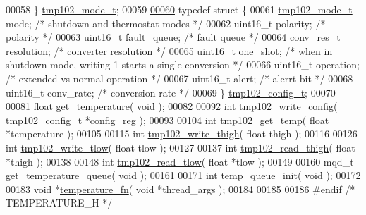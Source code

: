\begin{DoxyCode}
00058 \} \hyperlink{structtmp102__mode__t}{tmp102\_mode\_t};
00059 
\hyperlink{structtmp102__config__t}{00060} \textcolor{keyword}{typedef} \textcolor{keyword}{struct }\{
00061    \hyperlink{structtmp102__mode__t}{tmp102\_mode\_t} mode;     \textcolor{comment}{/* shutdown and thermostat modes */}
00062    uint16\_t polarity;      \textcolor{comment}{/* polarity */}
00063    uint16\_t fault\_queue;   \textcolor{comment}{/* fault queue */}
00064    \hyperlink{structconv__res__t}{conv\_res\_t} resolution;  \textcolor{comment}{/* converter resolution */}
00065    uint16\_t one\_shot;      \textcolor{comment}{/* when in shutdown mode, writing 1 starts a single conversion */}
00066    uint16\_t operation;     \textcolor{comment}{/* extended vs normal operation */}
00067    uint16\_t alert;         \textcolor{comment}{/* alerrt bit */}
00068    uint16\_t conv\_rate;     \textcolor{comment}{/* conversion rate */}
00069 \} \hyperlink{structtmp102__config__t}{tmp102\_config\_t};
00070 
00081 \textcolor{keywordtype}{float} \hyperlink{temperature_8h_a47f06fefabeb93c38acaface0c1f0a1d}{get\_temperature}( \textcolor{keywordtype}{void} );
00082 
00092 \textcolor{keywordtype}{int} \hyperlink{temperature_8h_acd7ca9077d8d9806394cf01abdc944e4}{tmp102\_write\_config}( \hyperlink{structtmp102__config__t}{tmp102\_config\_t} *config\_reg );
00093 
00104 \textcolor{keywordtype}{int} \hyperlink{temperature_8h_ae8c3bd4aa2bae886c806126b137260cc}{tmp102\_get\_temp}( \textcolor{keywordtype}{float} *temperature );
00105 
00115 \textcolor{keywordtype}{int} \hyperlink{temperature_8h_a3981b7fa33f651b8ccb69c57a367d2a6}{tmp102\_write\_thigh}( \textcolor{keywordtype}{float} thigh );
00116 
00126 \textcolor{keywordtype}{int} \hyperlink{temperature_8h_a1f00b98eda6de0f346820505fe01d35a}{tmp102\_write\_tlow}( \textcolor{keywordtype}{float} tlow );
00127 
00137 \textcolor{keywordtype}{int} \hyperlink{temperature_8h_a4d0f60419e315719e9ae80690a40240f}{tmp102\_read\_thigh}( \textcolor{keywordtype}{float} *thigh );
00138 
00148 \textcolor{keywordtype}{int} \hyperlink{temperature_8h_abd5568ce7a9d3c7f0c13bea9138b5bec}{tmp102\_read\_tlow}( \textcolor{keywordtype}{float} *tlow );
00149 
00160 mqd\_t \hyperlink{temperature_8h_a4fb20f64bbc451d19252c2748bad1cb6}{get\_temperature\_queue}( \textcolor{keywordtype}{void} );
00161 
00171 \textcolor{keywordtype}{int} \hyperlink{temperature_8h_a8eabbde1b6f330ffc5ccc89d30064138}{temp\_queue\_init}( \textcolor{keywordtype}{void} );
00172 
00183 \textcolor{keywordtype}{void} *\hyperlink{temperature_8h_ae0afede2f0dcd1931da5bed09ae70cd4}{temperature\_fn}( \textcolor{keywordtype}{void} *thread\_args );
00184 
00185 
00186 \textcolor{preprocessor}{#endif }\textcolor{comment}{/* TEMPERATURE\_H */}\textcolor{preprocessor}{}
\end{DoxyCode}
